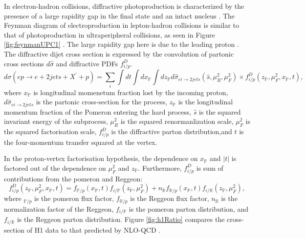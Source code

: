 In electron-hadron collisions, diffractive photoproduction is characterized by the presence of a large rapidity gap in the final state and an intact nucleus \cite{Frankfurt:2006tp,Alexa:2013xxa,Aktas:2006qs}. The Feynman diagram of electroproduction in lepton-hadron collisions is similar to that of photoproduction in ultraperipheral collisions, as seen in Figure \ref{fig:feynmanUPC1} \cite{Andreev:2015cwa}. The large rapidity gap here is due to the leading proton \cite{Aaron:2010aa}. The diffractive dijet cross section is expressed by the convolution of partonic cross sections $d\hat{\sigma}$ and diffractive PDFs $f^D_{i/p}$.
\begin{equation}
d\sigma (ep \rightarrow e + 2 jets + X^{'} + p) = \sum_{i} \int dt \int dx_\mathbb{P} \int dz_\mathbb{P}d\hat{\sigma}_{ei\rightarrow 2jets}(\hat{s},\mu^2_R,\mu^2_F)\times f^D_{i/p}(z_\mathbb{P},\mu^2_F,x_\mathbb{P},t) ,
\end{equation}
where $x_\mathbb{P}$ is longitudinal momenetum fraction lost by the incoming proton, $d\hat{\sigma}_{ei\rightarrow 2jets}$ is the partonic cross-section for the process, $z_\mathbb{P}$ is the longitudinal momentum fraction of the Pomeron entering the hard process, $\hat{s}$ is the squared invariant energy of the subprocess, $\mu^2_R$ is the squared renormanlization scale, $\mu^2_F$ is the squared factorisation scale, $f^D_{i/p}$ is the diffractive parton distribution,and $t$ is the four-momentum transfer squared at the vertex. 

In the proton-vertex factorisation hypothesis, the dependence on $x_{\mathbb{P}}$ and $|t|$ is factored out of the dependence on $\mu^2_F$ and $z_{\mathbb{P}}$. Furthermore, $f^D_{i/p}$ is sum of contributions from the pomeron and Reggeon:
\begin{equation}
f^D_{i/p}(z_{\mathbb{P}},\mu^2_F,x_{\mathbb{P}},t) = f_{\mathbb{P}/p}(x_{\mathbb{P}},t)f_{i/\mathbb{P}}(z_{\mathbb{P}},\mu^2_F) + n_\mathbb{R}f_{\mathbb{R}/p}(x_{\mathbb{P}},t)f_{i/\mathbb{R}}(z_{\mathbb{P}},
\mu^2_F) ,
\end{equation}
where $_{\mathbb{P}/p}$ is the pomeron flux factor, $f_{\mathbb{R}/p}$ is the Reggeon flux factor, $n_\mathbb{R}$ is the normalization factor of the Reggeon, $f_{i/\mathbb{P}}$ is the pomeron parton distribution, and $f_{i/\mathbb{R}}$ is the Reggeon parton distribution. Figure \ref{fig:h1Ratio} compares the cross-section of H1 data to that predicted by NLO-QCD \cite{Andreev:2015cwa}.

